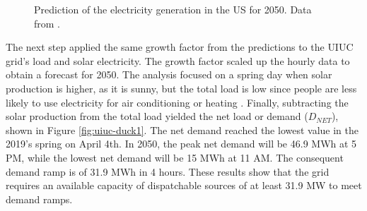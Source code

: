 \begin{figure}[htbp!]
    \centering
    \hfill
    \caption{Prediction of the electricity generation in the US for 2050. Data from \cite{us_energy_information_administration_electric_2020}.}
    \label{fig:prediction}
\end{figure}

The next step applied the same growth factor from the predictions to the \gls{UIUC} grid's load and solar electricity.
The growth factor scaled up the hourly data to obtain a forecast for 2050.
The analysis focused on a spring day when solar production is higher, as it is sunny, but the total load is low since people are less likely to use electricity for air conditioning or heating \cite{us_department_of_energy_confronting_2017}.
Finally, subtracting the solar production from the total load yielded the net load or demand ($D_{NET}$), shown in Figure \ref{fig:uiuc-duck1}.
The net demand reached the lowest value in the 2019's spring on April 4th.
In 2050, the peak net demand will be 46.9 MWh at 5 PM, while the lowest net demand will be 15 MWh at 11 AM.
The consequent demand ramp is of 31.9 MWh in 4 hours.
These results show that the grid requires an available capacity of dispatchable sources of at least 31.9 MW to meet demand ramps.

